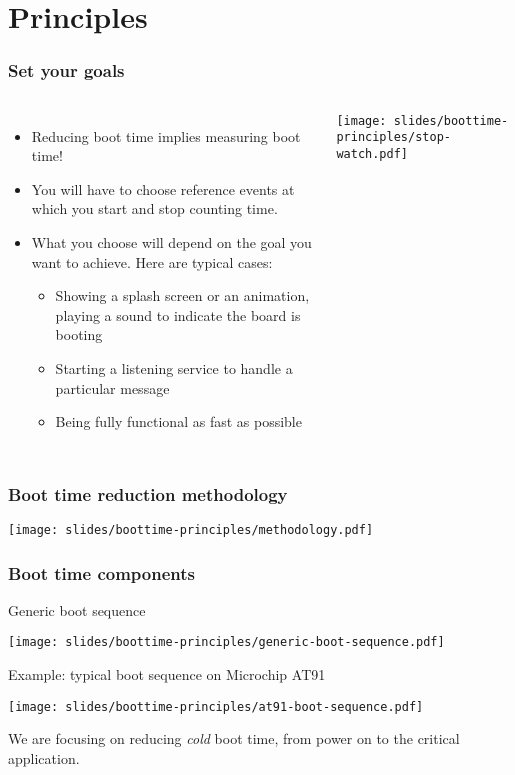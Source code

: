\section{Principles}

\begin{frame}
\frametitle{Set your goals}
\begin{columns}
    \begin{itemize}
	\item Reducing boot time implies measuring boot time!
	\item You will have to choose reference events at which you
       	      start and stop counting time.
	\item What you choose will depend on the goal you want to
              achieve. Here are typical cases:
	\begin{itemize}
		\item Showing a splash screen or an animation, playing a sound to
	              indicate the board is booting
		\item Starting a listening service to handle a particular
	              message
	        \item Being fully functional as fast as possible
	\end{itemize}
    \end{itemize}
    \texttt{[image: slides/boottime-principles/stop-watch.pdf]}
  \end{columns}
\end{frame}

\begin{frame}
\frametitle{Boot time reduction methodology}
\begin{center}
    \texttt{[image: slides/boottime-principles/methodology.pdf]}
\end{center}
\end{frame}

\begin{frame}
\frametitle{Boot time components}
Generic boot sequence
\begin{center}
    \texttt{[image: slides/boottime-principles/generic-boot-sequence.pdf]}
\end{center}
Example: typical boot sequence on Microchip AT91
\begin{center}
    \texttt{[image: slides/boottime-principles/at91-boot-sequence.pdf]}
\end{center}
We are focusing on reducing {\em cold} boot time, from power on to the
critical application.
\end{frame}

